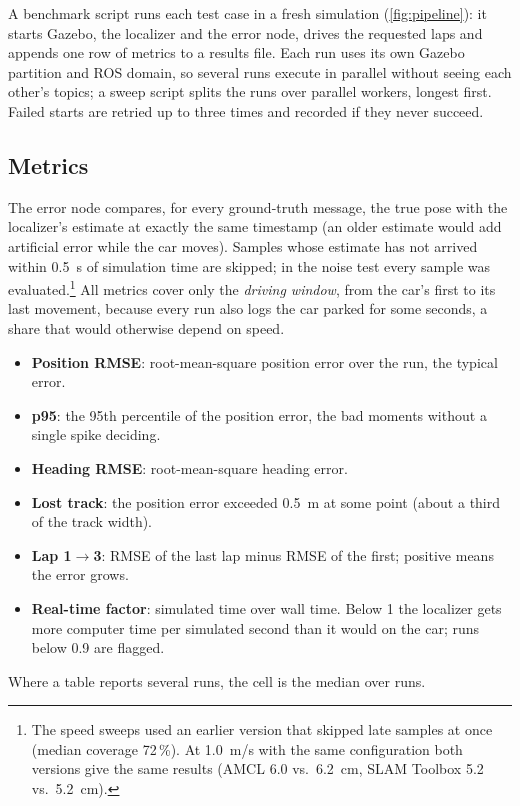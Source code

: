 \documentclass[11pt,letterpaper]{article}
\begin{document}
A benchmark script runs each test case in a fresh simulation (\cref{fig:pipeline}): it starts
Gazebo, the localizer and the error node, drives the requested laps and appends one row of metrics
to a results file. Each run uses its own Gazebo partition and ROS domain, so several runs execute in
parallel without seeing each other's topics; a sweep script splits the runs over parallel workers,
longest first. Failed starts are retried up to three times and recorded if they never succeed.

\subsection{Metrics}

The error node compares, for every ground-truth message, the true pose with the localizer's estimate
at exactly the same timestamp (an older estimate would add artificial error while the car moves).
Samples whose estimate has not arrived within \SI{0.5}{s} of simulation time are skipped; in the
noise test every sample was evaluated.\footnote{The speed sweeps used an earlier version that skipped late
samples at once (median coverage 72\,\%). At \SI{1.0}{m/s} with the same configuration both versions
give the same results (AMCL 6.0 vs.\ \SI{6.2}{cm}, SLAM Toolbox 5.2 vs.\ \SI{5.2}{cm}).} All metrics cover
only the \emph{driving window}, from the car's first to its last movement, because every run also
logs the car parked for some seconds, a share that would otherwise depend on speed.
\begin{itemize}[leftmargin=1.5em]
  \item \textbf{Position RMSE}: root-mean-square position error over the run, the typical error.
  \item \textbf{p95}: the 95th percentile of the position error, the bad moments without a single
        spike deciding.
  \item \textbf{Heading RMSE}: root-mean-square heading error.
  \item \textbf{Lost track}: the position error exceeded \SI{0.5}{m} at some point (about a third of
        the track width).
  \item \textbf{Lap 1$\to$3}: RMSE of the last lap minus RMSE of the first; positive means the error
        grows.
  \item \textbf{Real-time factor}: simulated time over wall time. Below 1 the localizer gets more
        computer time per simulated second than it would on the car; runs below 0.9 are flagged.
\end{itemize}
Where a table reports several runs, the cell is the median over runs.
\end{document}
